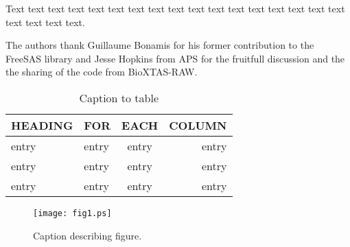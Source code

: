 \documentclass[preprint]{iucr}              %
\begin{document}
Text text text text text text text text text text text text text text
text text text text text text text.




The authors thank Guillaume Bonamis for his former contribution to the FreeSAS library and Jesse Hopkins from APS for the fruitfull 
discussion and the the sharing of the code from BioXTAS-RAW.




\begin{table}
\caption{Caption to table}
\begin{tabular}{llcr}      %
 HEADING    & FOR        & EACH       & COLUMN     \\
\hline
 entry      & entry      & entry      & entry      \\
 entry      & entry      & entry      & entry      \\
 entry      & entry      & entry      & entry      \\
\end{tabular}
\end{table}


\begin{figure}
\caption{Caption describing figure.}
\texttt{[image: fig1.ps]}
\end{figure}



\end{document}
